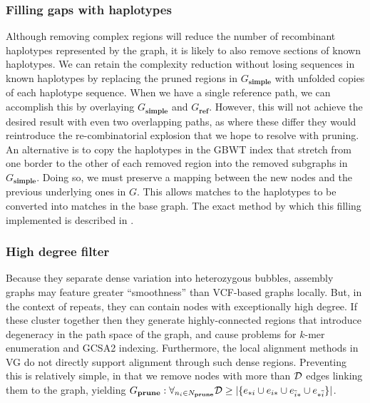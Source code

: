 \subsubsection{Filling gaps with haplotypes}

Although removing complex regions will reduce the number of recombinant haplotypes represented by the graph, it is likely to also remove sections of known haplotypes.
We can retain the complexity reduction without losing sequences in known haplotypes by replacing the pruned regions in $G_\textbf{simple}$ with unfolded copies of each haplotype sequence.
When we have a single reference path, we can accomplish this by overlaying $G_\textbf{simple}$ and $G_\textbf{ref}$.
However, this will not achieve the desired result with even two overlapping paths, as where these differ they would reintroduce the re-combinatorial explosion that we hope to resolve with pruning.
An alternative is to copy the haplotypes in the GBWT index that stretch from one border to the other of each removed region into the removed subgraphs in $G_\textbf{simple}$.
Doing so, we must preserve a mapping between the new nodes and the previous underlying ones in $G$.
This allows matches to the haplotypes to be converted into matches in the base graph.
The exact method by which this filling implemented is described in \cite{siren2018haplotype}.

\subsubsection{High degree filter}

Because they separate dense variation into heterozygous bubbles, assembly graphs may feature greater ``smoothness'' than VCF-based graphs locally.
But, in the context of repeats, they can contain nodes with exceptionally high degree.
If these cluster together then they generate highly-connected regions that introduce degeneracy in the path space of the graph, and cause problems for $k$-mer enumeration and GCSA2 indexing.
Furthermore, the local alignment methods in VG do not directly support alignment through such dense regions.
Preventing this is relatively simple, in that we remove nodes with more than ${\cal D}$ edges linking them to the graph, yielding $G_\textbf{prune} : \forall_{n_i \in N_\textbf{prune}}{{\cal D} \geq |\{ e_{*i} \cup e_{i*} \cup e_{\overline{i}*} \cup e_{*\overline{i}} \}|}$.


